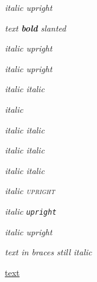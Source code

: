 \documentclass[12pt]{article}
\newcommand\"{quote}
\begin{document}
\textit{italic \textup{upright}}

\textsl{text \textbf{bold} slanted}

\textit{italic \textmd{upright}}

\textit{italic \emph{upright}}

\textit{italic \textsf{italic}}

\textit{italic }

\textit{italic \textrm{italic}}

\textit{italic \textsl{italic}}

\textsl{italic \textit{italic}}

\textit{italic \textsc{upright}}

\textsl{italic \texttt{upright}}

\textit{italic \textnormal{upright}}

\textit{text {in braces} still italic}

\underline{text}
\end{document}
